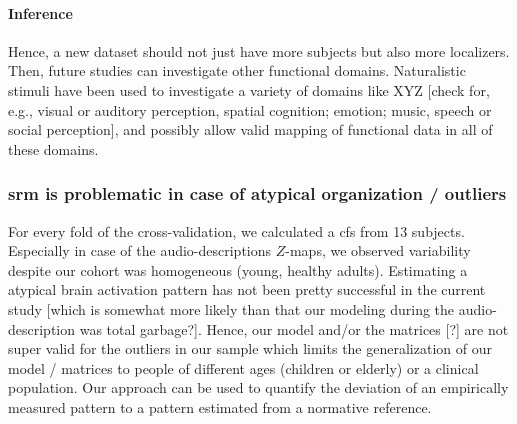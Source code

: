 \paragraph{Inference}




%
Hence, a new dataset should not just have more subjects but also more
localizers.
%
Then, future studies can investigate other functional domains.
%
Naturalistic stimuli have been used to investigate a variety of domains like XYZ
[check for, e.g., visual or auditory perception, spatial cognition; emotion;
music, speech or social perception], and possibly allow valid mapping of
functional data in all of these domains.


\subsubsection{\ac{srm} is problematic in case of atypical organization /
outliers}



%
For every fold of the cross-validation, we calculated a \ac{cfs} from 13
subjects.
%
Especially in case of the audio-descriptions $Z$-maps, we observed variability
despite our cohort was homogeneous (young, healthy adults).
%
Estimating a atypical brain activation pattern has not been pretty successful in
the current study [which is somewhat more likely than that our modeling during
the audio-description was total garbage?].
%
Hence, our model and/or the matrices [?] are not super valid for the outliers in
our sample which limits the generalization of our model / matrices to people of
different ages (children or elderly) or a clinical population.
%
Our approach can be used to quantify the deviation of an empirically measured
pattern to a pattern estimated from a normative reference.
%

